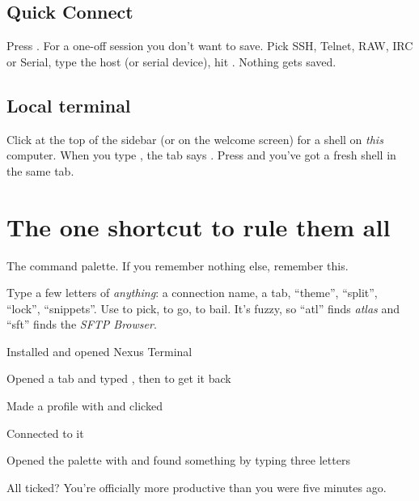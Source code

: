 \subsection{Quick Connect}
Press .
For a one-off session you don't want to save. Pick SSH, Telnet, RAW, IRC or Serial, type the host (or serial
device), hit . Nothing gets saved.


\subsection{Local terminal}
Click  at the top of the sidebar (or  on the welcome screen) for a shell on
\emph{this} computer. When you type , the tab says .
Press  and you've got a fresh shell in the same tab.

\section{The one shortcut to rule them all}

\begin{center}
\begin{tcolorbox}[enhanced, width=0.8\linewidth, arc=3pt, boxrule=0.8pt, colframe=uink, colback=white,
  halign=center, top=10pt, bottom=10pt]
{}\par\vspace{6pt}\par\vspace{4pt}
{\color{ugrey} The command palette. If you remember nothing else, remember this.}
\end{tcolorbox}
\end{center}

Type a few letters of \emph{anything}: a connection name, a tab, ``theme'', ``split'', ``lock'', ``snippets''. Use
 to pick,  to go,  to bail. It's fuzzy, so ``atl'' finds \emph{atlas} and
``sft'' finds the \emph{SFTP Browser}.


\begin{quickwin}
\begin{checklist}
  \item Installed and opened Nexus Terminal
  \item Opened a  tab and typed , then  to get it back
  \item Made a profile with  and clicked 
  \item Connected to it
  \item Opened the palette with  and found something by typing three letters
\end{checklist}
All ticked? You're officially more productive than you were five minutes ago. \iConfetti
\end{quickwin}

